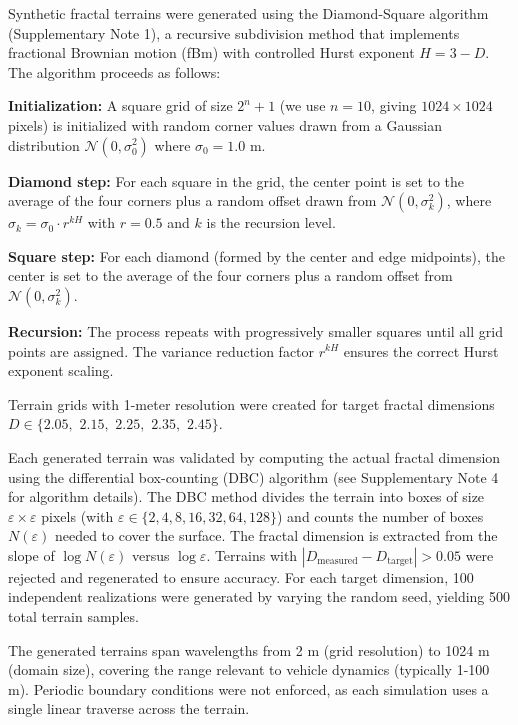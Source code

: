 \documentclass[11pt]{article}
\begin{document}
Synthetic fractal terrains were generated using the Diamond-Square algorithm\cite{Voss1985} (Supplementary Note 1), a recursive subdivision method that implements fractional Brownian motion (fBm) with controlled Hurst exponent $H = 3-D$. The algorithm proceeds as follows:

\textbf{Initialization:} A square grid of size $2^n + 1$ (we use $n = 10$, giving $1024 \times 1024$ pixels) is initialized with random corner values drawn from a Gaussian distribution $\mathcal{N}(0, \sigma_0^2)$ where $\sigma_0 = 1.0$ m.

\textbf{Diamond step:} For each square in the grid, the center point is set to the average of the four corners plus a random offset drawn from $\mathcal{N}(0, \sigma_k^2)$, where $\sigma_k = \sigma_0 \cdot r^{kH}$ with $r = 0.5$ and $k$ is the recursion level.

\textbf{Square step:} For each diamond (formed by the center and edge midpoints), the center is set to the average of the four corners plus a random offset from $\mathcal{N}(0, \sigma_k^2)$.

\textbf{Recursion:} The process repeats with progressively smaller squares until all grid points are assigned. The variance reduction factor $r^{kH}$ ensures the correct Hurst exponent scaling.

Terrain grids with 1-meter resolution were created for target fractal dimensions $D \in \{2.05,$ $2.15,$ $2.25,$ $2.35,$ $2.45\}$. 

Each generated terrain was validated by computing the actual fractal dimension using the differential box-counting (DBC) algorithm\cite{Sarkar1994} (see Supplementary Note 4 for algorithm details). The DBC method divides the terrain into boxes of size $\varepsilon \times \varepsilon$ pixels (with $\varepsilon \in \{2, 4, 8, 16, 32, 64, 128\}$) and counts the number of boxes $N(\varepsilon)$ needed to cover the surface. The fractal dimension is extracted from the slope of $\log N(\varepsilon)$ versus $\log \varepsilon$. Terrains with $|D_{\text{measured}} - D_{\text{target}}| > 0.05$ were rejected and regenerated to ensure accuracy. For each target dimension, 100 independent realizations were generated by varying the random seed, yielding 500 total terrain samples.

The generated terrains span wavelengths from 2 m (grid resolution) to 1024 m (domain size), covering the range relevant to vehicle dynamics (typically 1-100 m). Periodic boundary conditions were not enforced, as each simulation uses a single linear traverse across the terrain.
\end{document}
